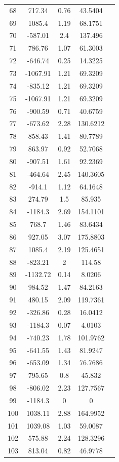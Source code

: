 {\begin{longtable}{ccccc}
68 & 717.34 & 0.76 & 43.5404 \\ 
69 & 1085.4 & 1.19 & 68.1751 \\ 
70 & -587.01 & 2.4 & 137.496 \\ 
71 & 786.76 & 1.07 & 61.3003 \\ 
72 & -646.74 & 0.25 & 14.3225 \\ 
73 & -1067.91 & 1.21 & 69.3209 \\ 
74 & -835.12 & 1.21 & 69.3209 \\ 
75 & -1067.91 & 1.21 & 69.3209 \\ 
76 & -900.59 & 0.71 & 40.6759 \\ 
77 & -673.62 & 2.28 & 130.6212 \\ 
78 & 858.43 & 1.41 & 80.7789 \\ 
79 & 863.97 & 0.92 & 52.7068 \\ 
80 & -907.51 & 1.61 & 92.2369 \\ 
81 & -464.64 & 2.45 & 140.3605 \\ 
82 & -914.1 & 1.12 & 64.1648 \\ 
83 & 274.79 & 1.5 & 85.935 \\ 
84 & -1184.3 & 2.69 & 154.1101 \\ 
85 & 768.7 & 1.46 & 83.6434 \\ 
86 & 927.05 & 3.07 & 175.8803 \\ 
87 & 1085.4 & 2.19 & 125.4651 \\ 
88 & -823.21 & 2 & 114.58 \\ 
89 & -1132.72 & 0.14 & 8.0206 \\ 
90 & 984.52 & 1.47 & 84.2163 \\ 
91 & 480.15 & 2.09 & 119.7361 \\ 
92 & -326.86 & 0.28 & 16.0412 \\ 
93 & -1184.3 & 0.07 & 4.0103 \\ 
94 & -740.23 & 1.78 & 101.9762 \\ 
95 & -641.55 & 1.43 & 81.9247 \\ 
96 & -653.09 & 1.34 & 76.7686 \\ 
97 & 795.65 & 0.8 & 45.832 \\ 
98 & -806.02 & 2.23 & 127.7567 \\ 
99 & -1184.3 & 0 & 0 \\ 
100 & 1038.11 & 2.88 & 164.9952 \\ 
101 & 1039.08 & 1.03 & 59.0087 \\ 
102 & 575.88 & 2.24 & 128.3296 \\ 
103 & 813.04 & 0.82 & 46.9778 \\ 

\end{longtable}}
